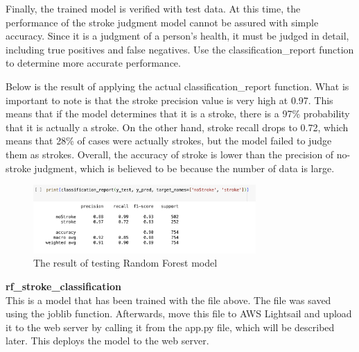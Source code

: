Finally, the trained model is verified with test data. At this time, the performance of the stroke judgment model cannot be assured with simple accuracy. Since it is a judgment of a person's health, it must be judged in detail, including true positives and false negatives. Use the classification\_report function to determine more accurate performance.

Below is the result of applying the actual classification\_report function. What is important to note is that the stroke precision value is very high at 0.97. This means that if the model determines that it is a stroke, there is a 97\% probability that it is actually a stroke. On the other hand, stroke recall drops to 0.72, which means that 28\% of cases were actually strokes, but the model failed to judge them as strokes. Overall, the accuracy of stroke is lower than the precision of no-stroke judgment, which is believed to be because the number of data is large.\\
\begin{figure}[h]
    \centering
    \includegraphics[width=8.5cm]{images/rf_result.png}
    \caption{The result of testing Random Forest model}
    \label{fig:enter-label}
\end{figure}


\textbf{rf\_stroke\_classification} \\
This is a model that has been trained with the file above. The file was saved using the joblib function. Afterwards, move this file to AWS Lightsail and upload it to the web server by calling it from the app.py file, which will be described later. This deploys the model to the web server.\\

